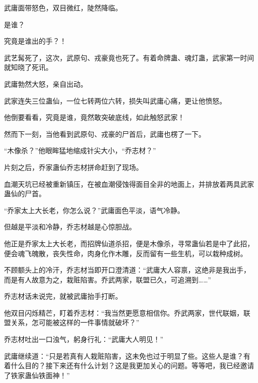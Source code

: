 \begin{this_body}
武庸面带怒色，双目微红，陡然降临。

是谁？

究竟是谁出的手？！

武艺髯死了，这次，武原句、戎豪竟也死了。有着命牌蛊、魂灯蛊，武家第一时间就知晓了死讯。

武庸勃然大怒，亲自出动。

武家连失三位蛊仙，一位七转两位六转，损失叫武庸心痛，更让他愤怒。

他倒要看看，究竟是谁，竟然敢突破底线，如此触怒武家！

然而下一刻，当他看到武原句、戎豪的尸首后，武庸也楞了一下。

“木像杀？”他眼眸猛地缩成针尖大小，“乔志材？”

片刻之后，乔家蛊仙乔志材拼命赶到了现场。

血潮天坑已经被重新镇压，在被血潮侵蚀得面目全非的地面上，并排放着两具武家蛊仙的尸首。

“乔家太上大长老，你怎么说？”武庸面色平淡，语气冷静。

但越是平淡和冷静，乔志材越是心惊胆战。

他正是乔家太上大长老，而招牌仙道杀招，便是木像杀，寻常蛊仙若是中了此招，便会魂飞魄散，丧失性命，肉身化作木雕，反而留有一些生机，可以栽种成树。

不顾额头上的冷汗，乔志材当即开口澄清道：“武庸大人容禀，这绝非是我出手，而是有人故意为之，栽赃陷害。乔武两家，联盟已久，可追溯到……”

乔志材话未说完，就被武庸抬手打断。

他双目闪烁精芒，盯着乔志材：“我当然更愿意相信你。乔武两家，世代联姻，联盟关系，怎可能被这样的一件事情就破坏？”

乔志材吐出一口浊气，躬身行礼：“武庸大人明见！”

武庸继续道：“只是若真有人栽赃陷害，这未免也过于明显了些。这些人是谁？有着什么目的？接下来还有什么计划？这是我更加关心的问题。等等吧，我已经邀请了铁家蛊仙铁面神！”

\end{this_body}

